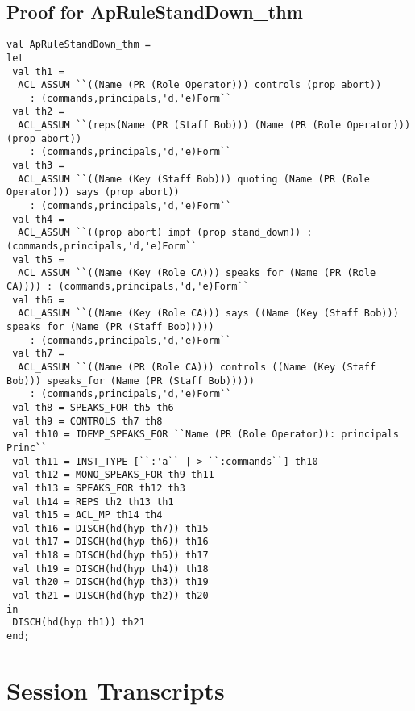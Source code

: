 \documentclass{report}
\begin{document}
\subsection{Proof for ApRuleStandDown_thm}
\label{proof-14-4}
\begin{lstlisting}[frame=TBlr]
val ApRuleStandDown_thm =
let
 val th1 = 
  ACL_ASSUM ``((Name (PR (Role Operator))) controls (prop abort))
    : (commands,principals,'d,'e)Form``
 val th2 = 
  ACL_ASSUM ``(reps(Name (PR (Staff Bob))) (Name (PR (Role Operator))) (prop abort))
    : (commands,principals,'d,'e)Form``
 val th3 = 
  ACL_ASSUM ``((Name (Key (Staff Bob))) quoting (Name (PR (Role Operator))) says (prop abort))
    : (commands,principals,'d,'e)Form``
 val th4 = 
  ACL_ASSUM ``((prop abort) impf (prop stand_down)) : (commands,principals,'d,'e)Form``
 val th5 = 
  ACL_ASSUM ``((Name (Key (Role CA))) speaks_for (Name (PR (Role CA)))) : (commands,principals,'d,'e)Form``
 val th6 = 
  ACL_ASSUM ``((Name (Key (Role CA))) says ((Name (Key (Staff Bob))) speaks_for (Name (PR (Staff Bob)))))
    : (commands,principals,'d,'e)Form``
 val th7 = 
  ACL_ASSUM ``((Name (PR (Role CA))) controls ((Name (Key (Staff Bob))) speaks_for (Name (PR (Staff Bob)))))
    : (commands,principals,'d,'e)Form``
 val th8 = SPEAKS_FOR th5 th6
 val th9 = CONTROLS th7 th8
 val th10 = IDEMP_SPEAKS_FOR ``Name (PR (Role Operator)): principals Princ``
 val th11 = INST_TYPE [``:'a`` |-> ``:commands``] th10
 val th12 = MONO_SPEAKS_FOR th9 th11
 val th13 = SPEAKS_FOR th12 th3
 val th14 = REPS th2 th13 th1
 val th15 = ACL_MP th14 th4
 val th16 = DISCH(hd(hyp th7)) th15
 val th17 = DISCH(hd(hyp th6)) th16
 val th18 = DISCH(hd(hyp th5)) th17
 val th19 = DISCH(hd(hyp th4)) th18
 val th20 = DISCH(hd(hyp th3)) th19
 val th21 = DISCH(hd(hyp th2)) th20
in
 DISCH(hd(hyp th1)) th21
end;
\end{lstlisting}


\section{Session Transcripts}
\label{trans-14}
\end{document}
